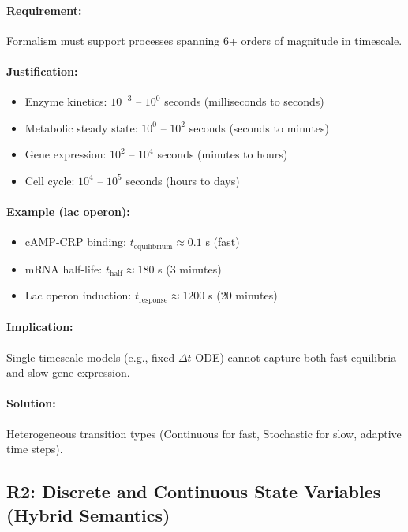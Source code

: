 \paragraph{Requirement:} Formalism must support processes spanning 6+ orders of magnitude in timescale.

\paragraph{Justification:}
\begin{itemize}
    \item Enzyme kinetics: $10^{-3}$ -- $10^0$ seconds (milliseconds to seconds)
    \item Metabolic steady state: $10^0$ -- $10^2$ seconds (seconds to minutes)
    \item Gene expression: $10^2$ -- $10^4$ seconds (minutes to hours)
    \item Cell cycle: $10^4$ -- $10^5$ seconds (hours to days)
\end{itemize}

\paragraph{Example (lac operon):}
\begin{itemize}
    \item cAMP-CRP binding: $t_{\text{equilibrium}} \approx 0.1$ s (fast)
    \item mRNA half-life: $t_{\text{half}} \approx 180$ s (3 minutes)
    \item Lac operon induction: $t_{\text{response}} \approx 1200$ s (20 minutes)
\end{itemize}

\paragraph{Implication:} Single timescale models (e.g., fixed $\Delta t$ ODE) cannot capture both fast equilibria and slow gene expression.

\paragraph{Solution:} Heterogeneous transition types (Continuous for fast, Stochastic for slow, adaptive time steps).

\subsection{R2: Discrete and Continuous State Variables (Hybrid Semantics)}
\label{subsec:r2-hybrid}

